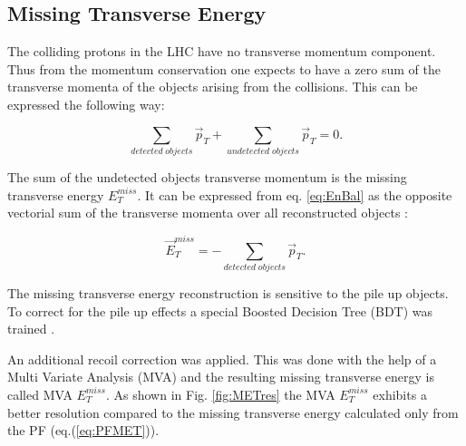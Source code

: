\subsection{Missing Transverse Energy}

The colliding protons in the LHC have no transverse momentum component. Thus from the momentum conservation one expects to have a zero sum of the transverse momenta of the 
objects arising from the collisions. This can be expressed the following way:

\begin{equation}\label{eq:EnBal}
 \sum_{detected\; objects} \vec{p}_{T} + \sum_{undetected\; objects} \vec{p}_{T} = 0.
\end{equation}

The sum of the undetected objects transverse momentum is the missing transverse energy $E_{T}^{miss}$.
It can be expressed from eq. \ref{eq:EnBal} as the opposite vectorial sum of the transverse momenta over all reconstructed objects \cite{CMS-PAS-PFT-09-001}:

\begin{equation}\label{eq:PFMET}
 \vec{E}^{miss}_{T} = - \sum_{detected\; objects} \vec{p}_{T}.
\end{equation}


The missing transverse energy reconstruction is sensitive to the pile up objects. To correct for the 
pile up effects a special Boosted Decision Tree (BDT) was trained \cite{CMS-PAS-JME-12-002}.

An additional recoil correction\cite{TWikiMET} was applied. This was done with the help of a 
Multi Variate Analysis (MVA) and the resulting missing transverse energy is called MVA $E_{T}^{miss}$.
As shown in Fig. \ref{fig:METres} the MVA $E_{T}^{miss}$ exhibits a better resolution compared to the 
missing transverse energy calculated only from the PF (eq.(\ref{eq:PFMET})).

